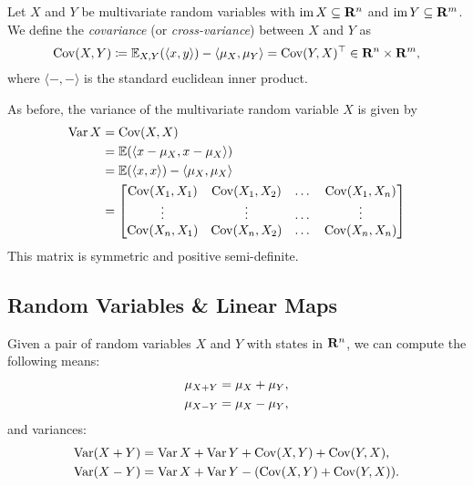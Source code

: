 \begin{definition}
    \label{def:covariance-multivariate}
    Let \(X\) and \(Y\) be multivariate random variables with \(\operatorname{im} X \subseteq
    \mathbf{R}^n\) and \(\operatorname{im} Y \subseteq \mathbf{R}^m\). We define the \emph{covariance} (or \emph{cross-variance}) between
    \(X\) and \(Y\) as
    \[
        \operatorname{Cov}(X, Y) \coloneq \operatorname{\mathbb{E}}_{X, Y}(\langle x, y \rangle) -
        \langle \mu_X , \mu_Y  \rangle
        = \operatorname{Cov}(Y, X)^{\operatorname{\top}} \in \mathbf{R}^n \times \mathbf{R}^m,
    \]
    where \(\langle -, - \rangle\) is the standard euclidean inner product.

    As before, the variance of the multivariate random variable \(X\) is given by
    \begin{align*}
        \operatorname{Var} X
         & = \operatorname{Cov}(X, X)                                                       \\
         & = \operatorname{\mathbb{E}}(\langle x - \mu_X, x - \mu_X \rangle)                \\
         & = \operatorname{\mathbb{E}}(\langle x, x \rangle) - \langle \mu_X, \mu_X \rangle \\
         & =
        \begin{bmatrix}
            \operatorname{Cov}(X_1, X_1) & \operatorname{Cov}(X_1, X_2) & \dots & \operatorname{Cov}(X_1, X_n) \\
            \vdots         & \vdots         & \dots & \vdots         \\
            \operatorname{Cov}(X_n, X_1) & \operatorname{Cov}(X_n, X_2) & \dots & \operatorname{Cov}(X_n, X_n) \\
        \end{bmatrix}
    \end{align*}
    This matrix is symmetric and positive semi-definite.
\end{definition}


\subsection{Random Variables \& Linear Maps}

\begin{lemma}
    \label{lem:sums-differences-random-variables}
    Given a pair of random variables \(X\) and \(Y\) with states in \(\mathbf{R}^n\), we can
    compute the following means:
    \begin{align*}
        \mu_{X + Y} & = \mu_X + \mu_Y, \\
        \mu_{X - Y} & = \mu_X - \mu_Y,
    \end{align*}
    and variances:
    \begin{align*}
        \operatorname{Var}(X + Y) & = \operatorname{Var} X + \operatorname{Var} Y + \operatorname{Cov}(X, Y) + \operatorname{Cov}(Y, X),   \\
        \operatorname{Var}(X - Y) & = \operatorname{Var} X + \operatorname{Var} Y - (\operatorname{Cov}(X, Y) + \operatorname{Cov}(Y, X)). \\
    \end{align*}
\end{lemma}

